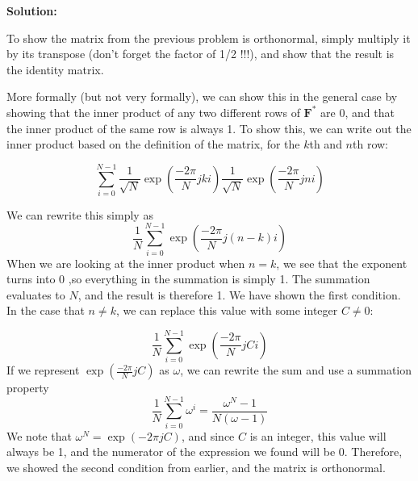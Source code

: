 \documentclass{article}
\begin{document}
\begin{enumerate}
    \textbf{Solution:}

    To show the matrix from the previous problem is orthonormal, simply multiply it by its transpose (don't forget the factor of 1/2 !!!), and show that the result is the identity matrix.

    More formally (but not very formally), we can show this in the general case by showing that the inner product of any two different rows of $\boldsymbol{F^*}$ are 0, and that the inner product of the same row is always 1. To show this, we can write out the inner product based on the definition of the matrix, for the $k$th and $n$th row:

    $$\sum_{i = 0}^{N-1} \frac{1}{\sqrt{N}}\exp(\frac{-2\pi}{N} jki) \frac{1}{\sqrt{N}}\exp(\frac{-2\pi}{N} jni)$$

    We can rewrite this simply as 
    $$\frac{1}{N}\sum_{i = 0}^{N-1} \exp(\frac{-2\pi}{N} j (n-k)i)$$
    When we are looking at the inner product when $n = k$, we see that the exponent turns into 0 ,so everything in the summation is simply 1. The summation evaluates to $N$, and the result is therefore 1. We have shown the first condition. In the case that $n \neq k$, we can replace this value with some integer $C \neq 0$:

    $$\frac{1}{N}\sum_{i = 0}^{N-1} \exp(\frac{-2\pi}{N} j C i)$$
    If we represent $\exp(\frac{-2\pi}{N} j C)$ as $\omega$, we can rewrite the sum and use a summation property 
    $$\frac{1}{N}\sum_{i = 0}^{N-1} \omega^i = \frac{\omega^N - 1}{N(\omega - 1)}$$
    We note that $\omega^N = \exp(-2\pi j C)$, and since $C$ is an integer, this value will always be 1, and the numerator of the expression we found will be 0. Therefore, we showed the second condition from earlier, and the matrix is orthonormal.

    
\end{enumerate}
\end{document}
